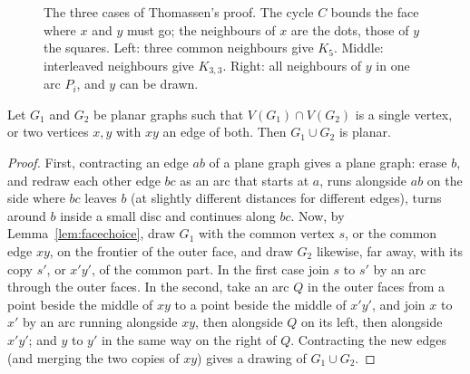 \begin{figure}[ht]
\centering
{}
\caption{The three cases of Thomassen's proof. The cycle $C$ bounds the face where $x$ and $y$ must go; the neighbours of $x$ are the dots, those of $y$ the
squares. Left: three common neighbours give $K_5$. Middle: interleaved neighbours give $K_{3,3}$. Right: all neighbours of $y$ in one arc $P_i$, and $y$
can be drawn.}
\label{fig:thomassen}
\end{figure}

\begin{lemma}\label{lem:glue}
Let $G_1$ and $G_2$ be planar graphs such that $V(G_1)\cap V(G_2)$ is a single vertex, or two vertices $x,y$ with $xy$ an edge of both. Then $G_1\cup G_2$ is planar.
\end{lemma}
\begin{proof}
First, contracting an edge $ab$ of a plane graph gives a plane graph: erase $b$, and redraw each other edge $bc$ as an arc that starts at $a$, runs alongside $ab$
on the side where $bc$ leaves $b$ (at slightly different distances for different edges), turns around $b$ inside a small disc and continues along $bc$.
Now, by Lemma~\ref{lem:facechoice}, draw $G_1$ with the common vertex $s$, or the common edge $xy$, on the frontier of the outer face, and draw $G_2$ likewise, far away,
with its copy $s'$, or $x'y'$, of the common part. In the first case join $s$ to $s'$ by an arc through the outer faces. In the second, take an arc $Q$ in the
outer faces from a point beside the middle of $xy$ to a point beside the middle of $x'y'$, and join $x$ to $x'$ by an arc running alongside $xy$, then alongside
$Q$ on its left, then alongside $x'y'$; and $y$ to $y'$ in the same way on the right of $Q$. Contracting the new edges (and merging the two copies of $xy$)
gives a drawing of $G_1\cup G_2$.
\end{proof}


